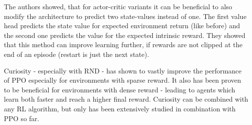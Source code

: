 The authors showed, that for actor-critic variants it can be beneficial to also modify the architecture to predict two state-values instead of one. The first value head predicts the state value for expected environment return (like before) and the second one predicts the value for the expected intrinsic reward. They showed that this method can improve learning further, if rewards are not clipped at the end of an episode (restart is just the next state). 

Curiosity - especially with RND - has shown to vastly improve the performance of PPO especially for environments with sparse reward. It also has been proven to be beneficial for environments with dense reward - leading to agents which learn both faster and reach a higher final reward. Curiosity can be combined with any RL algorithm, but only has been extensively studied in combination with PPO so far.